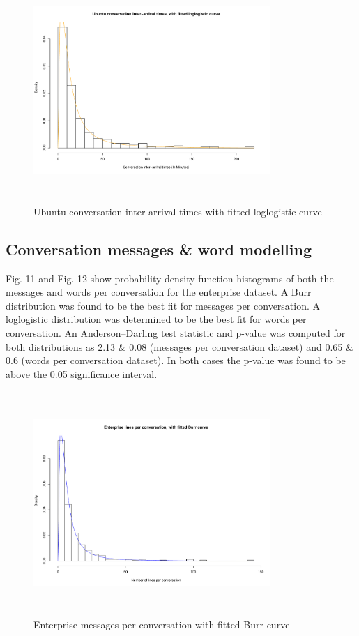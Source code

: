 \documentclass[conference]{IEEEtran}
\begin{document}
\begin{figure}
\begin{center}
\includegraphics[height=8.5cm, width=9cm]{10_interarrival_ubuntu.pdf} 
\caption{Ubuntu conversation inter-arrival times with fitted loglogistic curve}
\end{center}
\label{fig:interarrival_ubun}
\end{figure}

\subsection{Conversation messages \& word modelling}

Fig. 11 and Fig. 12 show probability density function histograms of both the messages and words per conversation for the enterprise dataset. 
 A Burr distribution was found to be the best fit for messages per conversation. A loglogistic distribution was determined to be the best fit for words per conversation.  An Anderson--Darling test statistic and p-value was computed for both distributions as 2.13 \& 0.08 (messages per conversation dataset) and 0.65 \& 0.6 (words per conversation dataset). In both cases the p-value was found to be above the 0.05 significance interval.

\begin{figure}
\begin{center}
\includegraphics[height=8.5cm, width=9cm]{11_messages_enterprise.pdf} 
\caption{Enterprise messages per conversation with fitted Burr curve}
\end{center}
\label{fig:interarrival_ent}
\end{figure}
\end{document}
